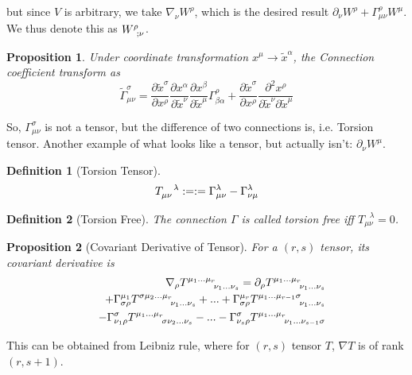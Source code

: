 \documentclass[a4paper]{article}
\theoremstyle{new}
\newtheorem{defi}{Definition}[section]
\newtheorem{prop}{Proposition}[section]
\begin{document}
but since $V$ is arbitrary, we take $\nabla_\nu W^\rho$, which is the desired result $\partial_\nu W^\rho+\Gamma_{\mu\nu}^\rho W^\mu$. We thus denote this as $\tensor*{W}{*_{}^{\rho}_{;\nu}}$. 
\begin{prop}
Under coordinate transformation $x^\mu\rightarrow\tilde{x}^\alpha$, the Connection coefficient transform as
$$\tilde{\Gamma}^\sigma_{\mu\nu}=\frac{\partial\tilde{x}^\sigma}{\partial x^\rho}\frac{\partial x^\alpha}{\partial\tilde{x}^\nu}\frac{\partial x^\beta}{\partial\tilde{x}^\mu}\Gamma_{\beta\alpha}^\rho+\frac{\partial\tilde{x}^\sigma}{\partial x^\rho}\frac{\partial^2x^\rho}{\partial\tilde{x}^\nu\partial\tilde{x}^\mu}$$
\end{prop}
So, $\Gamma_{\mu\nu}^\sigma$ is not a tensor, but the difference of two connections is, i.e. Torsion tensor. Another example of what looks like a tensor, but actually isn't: $\partial_\nu W^\mu$. 
\begin{defi}[Torsion Tensor]
$$\tensor*{T}{*^{}_{\mu\nu}^{\lambda}}:=:=\Gamma_{\mu\nu}^\lambda-\Gamma_{\nu\mu}^\lambda$$
\end{defi}
\begin{defi}[Torsion Free]
The connection $\Gamma$ is called torsion free iff $T_{\mu\nu}^{\text{  }\lambda}=0$.
\end{defi}
\begin{prop}[Covariant Derivative of Tensor]
For a $(r,s)$ tensor, its covariant derivative is
\begin{eqnarray}
&&\nabla_\rho\tensor*{T}{*_{}^{\mu_1...\mu_r}_{\nu_1...\nu_s}}=\partial_\rho\tensor*{T}{*_{}^{\mu_1...\mu_r}_{\nu_1...\nu_s}}\nonumber\\&&+\Gamma^{\mu_1}_{\sigma\rho}\tensor*{T}{*_{}^{\sigma\mu_2...\mu_r}_{\nu_1...\nu_s}}+...+\Gamma_{\sigma\rho}^{\mu_r}\tensor*{T}{*_{}^{\mu_1...\mu_{r-1}\sigma}_{\nu_1...\nu_s}}\nonumber\\&&-\Gamma_{\nu_1\rho}^\sigma \tensor*{T}{*_{}^{\mu_1...\mu_r}_{\sigma\nu_2...\nu_s}}-...-\Gamma_{\nu_s\rho}^\sigma \tensor*{T}{*_{}^{\mu_1...\mu_r}_{\nu_1...\nu_{s-1}\sigma}}\nonumber
\end{eqnarray}
\end{prop}
This can be obtained from Leibniz rule, where for $(r,s)$ tensor $T$, $\nabla T$ is of rank $(r,s+1)$.
\end{document}
